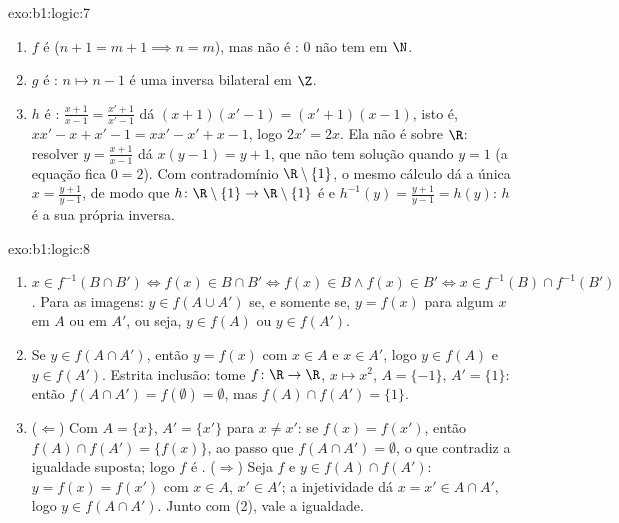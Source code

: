 \begin{solution}{exo:b1:logic:7}
\begin{enumerate}
  \item $f$ é  ($n + 1 = m + 1 \implies n = m$), mas não é
        : $0$ não tem  em $\N$.
  \item $g$ é : $n \mapsto n - 1$ é uma inversa bilateral em
        $\Z$.
  \item $h$ é : $\frac{x+1}{x-1} = \frac{x'+1}{x'-1}$ dá
        $(x+1)(x'-1) = (x'+1)(x-1)$, isto é, $xx' - x + x' - 1 = xx' -
        x' + x - 1$, logo $2x' = 2x$. Ela não é  sobre $\R$:
        resolver $y = \frac{x+1}{x-1}$ dá $x(y - 1) = y + 1$, que
        não tem solução quando $y = 1$ (a equação fica $0 = 2$).
        Com contradomínio $\R \setminus \{1\}$, o mesmo cálculo dá
        a única  $x = \frac{y+1}{y-1}$, de modo que
        $h \colon \R \setminus \{1\} \to \R \setminus \{1\}$ é
         e $h^{-1}(y) = \frac{y+1}{y-1} = h(y)$: $h$ é a sua
        própria inversa.
\end{enumerate}
\end{solution}

\begin{solution}{exo:b1:logic:8}
\begin{enumerate}
  \item $x \in f^{-1}(B \cap B') \iff f(x) \in B \cap B' \iff f(x) \in
        B \land f(x) \in B' \iff x \in f^{-1}(B) \cap f^{-1}(B')$.
        Para as imagens: $y \in f(A \cup A')$ se, e somente se, $y = f(x)$ para algum $x$
        em $A$ ou em $A'$, ou seja, $y \in f(A)$ ou $y \in f(A')$.
  \item Se $y \in f(A \cap A')$, então $y = f(x)$ com $x \in A$ e
        $x \in A'$, logo $y \in f(A)$ e $y \in f(A')$. Estrita inclusão:
        tome $f \colon \R \to \R$, $x \mapsto x^2$, $A = \{-1\}$,
        $A' = \{1\}$: então $f(A \cap A') = f(\emptyset) = \emptyset$,
        mas $f(A) \cap f(A') = \{1\}$.
  \item ($\Leftarrow$) Com $A = \{x\}$, $A' = \{x'\}$ para $x \neq
        x'$: se $f(x) = f(x')$, então $f(A) \cap f(A') = \{f(x)\}$,
        ao passo que $f(A \cap A') = \emptyset$, o que contradiz a
        igualdade suposta; logo $f$ é . ($\Rightarrow$) Seja $f$
         e $y \in f(A) \cap f(A')$: $y = f(x) = f(x')$ com
        $x \in A$, $x' \in A'$; a injetividade dá $x = x' \in A \cap
        A'$, logo $y \in f(A \cap A')$. Junto com (2), vale a igualdade.
\end{enumerate}
\end{solution}

